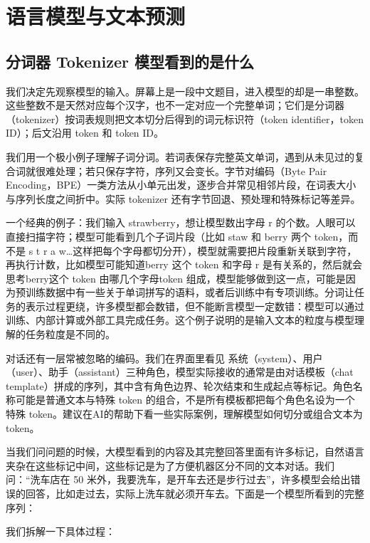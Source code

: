 \chapter{语言模型与文本预测}\label{语言模型与文本预测}

\section{分词器 Tokenizer 模型看到的是什么}\label{分词器 Tokenizer 模型看到的是什么}

我们决定先观察模型的输入。屏幕上是一段中文题目，进入模型的却是一串整数。这些整数不是天然对应每个汉字，也不一定对应一个完整单词；它们是分词器（tokenizer）按词表规则把文本切分后得到的词元标识符（token identifier，token ID）；后文沿用 token 和 token ID。

我们用一个极小例子理解子词分词。若词表保存完整英文单词，遇到从未见过的复合词就很难处理；若只保存字符，序列又会变长。字节对编码（Byte Pair Encoding，BPE）一类方法从小单元出发，逐步合并常见相邻片段，在词表大小与序列长度之间折中。实际 tokenizer 还有字节回退、预处理和特殊标记等差异。

一个经典的例子：我们输入 strawberry，想让模型数出字母 r 的个数。人眼可以直接扫描字符；模型可能看到几个子词片段（比如 staw 和 berry 两个 token，而不是 s t r a w\ldots 这样把每个字母都切分开），模型就需要把片段重新关联到字符，再执行计数，比如模型可能知道berry 这个 token 和字母 r 是有关系的，然后就会思考berry这个 token 由哪几个字母token 组成，模型能够做到这一点，可能是因为预训练数据中有一些关于单词拼写的语料，或者后训练中有专项训练。分词让任务的表示过程更绕，许多模型都会数错，但不能断言模型一定数错：模型可以通过训练、内部计算或外部工具完成任务。这个例子说明的是输入文本的粒度与模型理解的任务粒度是不同的。

对话还有一层常被忽略的编码。我们在界面里看见 系统（system）、用户（user）、助手（assistant）三种角色，模型实际接收的通常是由对话模板（chat template）拼成的序列，其中含有角色边界、轮次结束和生成起点等标记。角色名称可能是普通文本与特殊 token 的组合，不是所有模板都把每个角色名设为一个特殊 token。建议在AI的帮助下看一些实际案例，理解模型如何切分或组合文本为token。

当我们问问题的时候，大模型看到的内容及其完整回答里面有许多标记，自然语言夹杂在这些标记中间，这些标记是为了方便机器区分不同的文本对话。我们问：``洗车店在 50 米外，我要洗车，是开车去还是步行过去''，许多模型会给出错误的回答，比如走过去，实际上洗车就必须开车去。下面是一个模型所看到的完整序列：

我们拆解一下具体过程：

